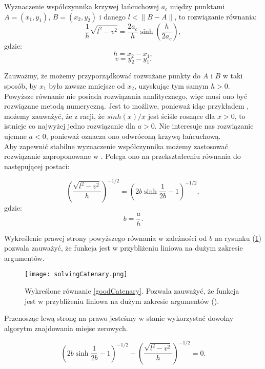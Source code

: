 Wyznaczenie współczynnika krzywej łańcuchowej $a_c$ między punktami $A = (x_1,y_1)$, $B = (x_2,y_2)$ i danego $l < \lVert B - A \rVert$, to rozwiązanie równania:
\begin{equation}
	\label{cat}
	\frac{1}{h} \sqrt{l^2-v^2} = \frac{2a_c}{h} \sinh\left( \frac{h}{2a_c} \right),
\end{equation}
gdzie:
$$
h = x_2 - x_1,
$$
$$
v = y_2 - y_1.
$$

Zauważmy, że możemy przyporządkować rozważane punkty do $A$ i $B$ w taki sposób, by $x_1$ było zawsze mniejsze od $x_2$, uzyskując tym samym $h > 0$.
\\

Powyższe równanie nie posiada rozwiązania analitycznego, więc musi ono być rozwiązane metodą numeryczną. Jest to możliwe, ponieważ idąc przykładem \cite{Routh_2013}, możemy zauważyć, że z racji, że $sinh(x)/x$ jest ściśle rosnące dla $x>0$, to istnieje co najwyżej jedno rozwiązanie dla $a>0$. Nie interesuje nas rozwiązanie ujemne $a < 0$, ponieważ oznacza ono odwróconą krzywą łańcuchową. 
\\

Aby zapewnić stabilne wyznaczenie współczynnika możemy zastosować rozwiązanie zaproponowane w \cite{1002996}. Polega ono na przekształceniu równania do następującej postaci:

\begin{equation}
	\label{goodCatenary}
	\left( \frac{\sqrt{l^2 - v^2}}{h} \right)^{-1/2} = \left( 2b\sinh\frac{1}{2b} - 1 \right)^{-1/2},
\end{equation}
gdzie:
$$
b = \frac{a}{h}.
$$

Wykreślenie prawej strony powyższego równania w zależności od $b$ na rysunku (\ref{solvingCatenary}) pozwala zauważyć, że funkcja jest w przybliżeniu liniowa na dużym zakresie argumentów.

\begin{figure}[h]
	\centering
	\texttt{[image: solvingCatenary.png]}
	\caption{Wykreślone równanie \ref{goodCatenary}. Pozwala zauważyć, że funkcja jest w przybliżeniu liniowa na dużym zakresie argumentów (\cite{1002996}).}
	\label{solvingCatenary}
\end{figure}

Przenosząc lewą stronę na prawo jesteśmy w stanie wykorzystać dowolny algorytm znajdowania miejsc zerowych. 


\begin{equation}
	\left( 2b\sinh\frac{1}{2b} - 1 \right)^{-1/2} - \left( \frac{\sqrt{l^2 - v^2}}{h} \right)^{-1/2} = 0.
\end{equation}

